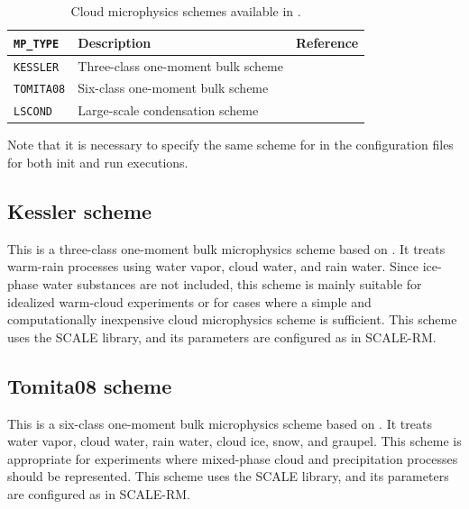 \begin{table}[htbp]
\caption{Cloud microphysics schemes available in \scaledg.}
\label{tab:mp_scheme_list}
\begin{center}
\begin{tabularx}{150mm}{lXX}
\hline
\rowcolor[gray]{0.9}
\verb|MP_TYPE| & Description & Reference \\
\hline
\verb|KESSLER|  & Three-class one-moment bulk scheme & \cite{kessler_1969} \\
\verb|TOMITA08| & Six-class one-moment bulk scheme   & \cite{tomita_2008} \\
\verb|LSCOND|   & Large-scale condensation scheme    &  \\
\hline
\end{tabularx}
\end{center}
\end{table}


Note that it is necessary to specify the same scheme for  in the configuration files for both init and run executions.


\subsection{Kessler scheme}
\label{subsec:physics_mp_kessler}
This is a three-class one-moment bulk microphysics scheme based on \cite{kessler_1969}.
It treats warm-rain processes using water vapor, cloud water, and rain water.
Since ice-phase water substances are not included, this scheme is mainly suitable for idealized warm-cloud experiments
or for cases where a simple and computationally inexpensive cloud microphysics scheme is sufficient.
This scheme uses the SCALE library, and its parameters are configured as in SCALE-RM. 

\subsection{Tomita08 scheme}
\label{subsec:physics_mp_tomita08}
This is a six-class one-moment bulk microphysics scheme based on \cite{tomita_2008}.
It treats water vapor, cloud water, rain water, cloud ice, snow, and graupel.
This scheme is appropriate for experiments where mixed-phase cloud and precipitation processes should be represented.
This scheme uses the SCALE library, and its parameters are configured as in SCALE-RM. 

